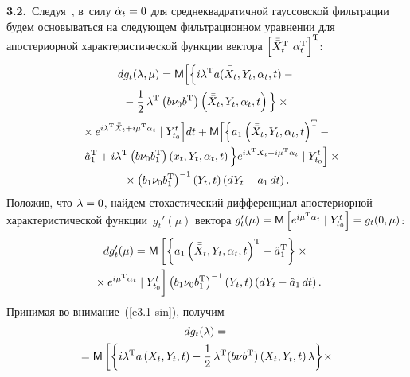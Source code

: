 \begin{multicols}{2}
\textbf{3.2.}\ Следуя~\cite{6-sin}, в~силу $\dot\alpha_t\hm=0$ для сред\-не\-квад\-ра\-тич\-ной  
гауссовской фильтрации будем основываться на следующем фильтрационном уравнении для 
апостериорной характеристической функции вектора  $\left[ \bar{\bar X}_t^{\mathrm{T}} \ \alpha_t^{\mathrm{T}}\right]^{\mathrm{T}}$:
    \begin{multline*}
    dg_t (\lambda,\mu) = \mathsf{M} \Big[\Big\{ i\lambda^{\mathrm{T}} a (\bar{\bar X}_t,Y_t,\alpha_t, t)-{}\\
{}-\displaystyle\frac{\displaystyle 1\mathstrut}{\displaystyle 2\mathstrut}\,\lambda^{\mathrm{T}} \left(b\nu_0 b^{\mathrm{T}}\right)
\left(\bar{\bar X}_t,Y_t,\alpha_t,t\right)\Big\} \times{}\\
{}\times
e^{i\lambda^{\mathrm{T}} \bar{\bar X}_t    +i\mu^{\mathrm{T}}\alpha_t} \mid Y_{t_0}^t\Big] dt+
\mathsf{M}\Big[\Big\{ a_1 \left(\bar{\bar X}_t,Y_t, \alpha_t,t\right)^{\mathrm{T}} -{}\\
{}-\hat a^{\mathrm{T}}_1
    +i\lambda^{\mathrm{T}} \left(b\nu_0 b_1^{\mathrm{T}}\right) \left(x_t,Y_t,\alpha_t, t\right)\Big\}
     e^{i\lambda^{\mathrm{T}}X_t+i\mu^{\mathrm{T}}\alpha_t} \mid Y_{t_0}^t \Big]\times{}\\
     {}\times
    \left(b_1\nu_0 b_1^{\mathrm{T}}\right)^{-1} (Y_t,t) \left(dY_t -a_{1} \,dt\right).
    \end{multline*}
Положив, что  $\lambda\hm=0$, найдем стохастический дифференциал
апостериорной характеристической функции~$g_t' (\mu)$ вектора
$ g_t' (\mu) \hm= \mathsf{M}\lk e^{i\mu^{\mathrm{T}}\alpha_t}\mid
Y_{t_0}^t\rk \hm= g_t (0,\mu)$:
   \begin{multline}
    dg_t' (\mu) = \mathsf{M}\left[ \left\{ a_1 \left(\bar{\bar X}_t,Y_t,\alpha_t,t\right)^{\mathrm{T}}-
    \hat a^{\mathrm{T}}_1\right\} \times{}\right.\\
    \left.{}\times e^{i\mu^{\mathrm{T}}\alpha_t}
    \mid Y_{t_0}^t
    \vphantom{\left\{ a_1 \left(\bar{\bar X}_t,Y_t,\alpha_t,t\right)^{\mathrm{T}}-
    \hat a^{\mathrm{T}}_1\right\}}
    \right] \left(b_1\nu_0 b_1^{\mathrm{T}}\right)^{-1} \left(Y_t,t\right) \left(dY_t-\hat a_1 \,dt\right).\label{e3.4-sin}
\end{multline}
Принимая во внимание~(\ref{e3.1-sin}), получим
\begin{multline}
dg_t(\lambda) = {}\\
{}=\mathsf{M} \left[ \left\{ i\lambda^{\mathrm{T}} a \left(X_t,Y_t,t\right) -
\fr{1}{2}\, \lambda^{\mathrm{T}} (b\nu b^{\mathrm{T}}) \left(X_t,Y_t,t\right) \lambda\right\}\!\times{}\right.\hspace*{-0.50635pt}\\

\end{multline}
\end{multicols}
